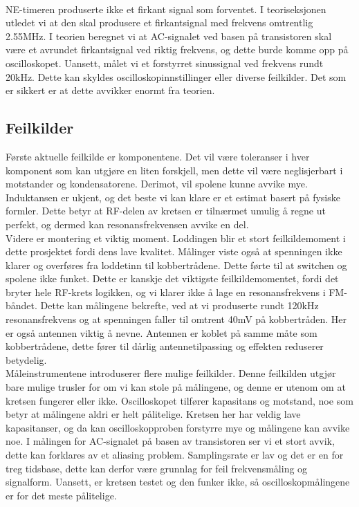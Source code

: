 \\[1em]
NE-timeren produserte ikke et firkant signal som forventet. I teoriseksjonen utledet vi at den skal produsere et firkantsignal med frekvens omtrentlig 2.55MHz. I teorien beregnet vi at AC-signalet ved basen på transistoren skal være et avrundet firkantsignal ved riktig frekvens, og dette burde komme opp på oscilloskopet. Uansett, målet vi et forstyrret sinussignal ved frekvens rundt 20kHz. Dette kan skyldes oscilloskopinnstillinger eller diverse feilkilder. Det som er sikkert er at dette avvikker enormt fra teorien.

\subsection{Feilkilder}
Første aktuelle feilkilde er komponentene. Det vil være toleranser i hver komponent som kan utgjøre en liten forskjell, men dette vil være neglisjerbart i motstander og kondensatorene. Derimot, vil spolene kunne avvike mye. Induktansen er ukjent, og det beste vi kan klare er et estimat basert på fysiske formler. Dette betyr at RF-delen av kretsen er tilnærmet umulig å regne ut perfekt, og dermed kan resonansfrekvensen avvike en del.
\\[1em]
Videre er montering et viktig moment. Loddingen blir et stort feilkildemoment i dette prosjektet fordi dens lave kvalitet. Målinger viste også at spenningen ikke klarer og overføres fra loddetinn til kobbertrådene. Dette førte til at switchen og spolene ikke funket. Dette er kanskje det viktigste feilkildemomentet, fordi det bryter hele RF-krets logikken, og vi klarer ikke å lage en resonansfrekvens i FM-båndet. Dette kan målingene bekrefte, ved at vi produserte rundt 120kHz resonansfrekvens og at spenningen faller til omtrent 40mV på kobbertråden. Her er også antennen viktig å nevne. Antennen er koblet på samme måte som kobbertrådene, dette fører til dårlig antennetilpassing og effekten reduserer betydelig.
\\[1em]
Måleinstrumentene introduserer flere mulige feilkilder. Denne feilkilden utgjør bare mulige trusler for om vi kan stole på målingene, og denne er utenom om at kretsen fungerer eller ikke. Oscilloskopet tilfører kapasitans og motstand, noe som betyr at målingene aldri er helt pålitelige. Kretsen her har veldig lave kapasitanser, og da kan oscilloskopproben forstyrre mye og målingene kan avvike noe. I målingen for AC-signalet på basen av transistoren ser vi et stort avvik, dette kan forklares av et aliasing problem. Samplingsrate er lav og det er en for treg tidsbase, dette kan derfor være grunnlag for feil frekvensmåling og signalform. Uansett, er kretsen testet og den funker ikke, så oscilloskopmålingene er for det meste pålitelige.
